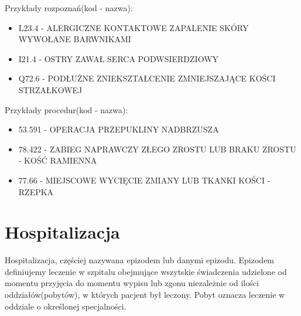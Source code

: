 Przykłady rozpoznań(kod - nazwa):
\begin{itemize}
\item L23.4 - ALERGICZNE KONTAKTOWE ZAPALENIE SKÓRY WYWOŁANE BARWNIKAMI
\item I21.4 - OSTRY ZAWAŁ SERCA PODWSIERDZIOWY
\item Q72.6 - PODŁUŻNE ZNIEKSZTAŁCENIE ZMNIEJSZAJĄCE KOŚCI STRZAŁKOWEJ
\end{itemize}

Przykłady procedur(kod - nazwa):
\begin{itemize}
\item 53.591 - OPERACJA PRZEPUKLINY NADBRZUSZA
\item 78.422 - ZABIEG NAPRAWCZY ZŁEGO ZROSTU LUB BRAKU ZROSTU - KOŚĆ RAMIENNA
\item 77.66 - MIEJSCOWE WYCIĘCIE ZMIANY LUB TKANKI KOŚCI - RZEPKA
\end{itemize}


\section{Hospitalizacja}
\label{sec:hospitalizacja}

Hospitalizacja, częściej nazywana epizodem lub danymi epizodu. Epizodem definiujemy leczenie w szpitalu obejmujące wszytskie świadczenia udzielone od momentu przyjęcia do momentu wypisu lub zgonu niezależnie od ilości oddziałów(pobytów), w których pacjent był leczony. Pobyt oznacza leczenie w oddziale o określonej specjalności.

